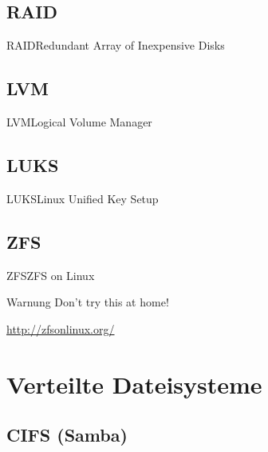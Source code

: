 \documentclass[pdflatex, ngerman]{beamer}
\begin{document}
\subsection{RAID}

\begin{frame}{RAID}{Redundant Array of Inexpensive Disks}

\end{frame}

\subsection{LVM}

\begin{frame}{LVM}{Logical Volume Manager}

\end{frame}

\subsection{LUKS}

\begin{frame}{LUKS}{Linux Unified Key Setup}

\end{frame}

\subsection{ZFS}

\begin{frame}{ZFS}{ZFS on Linux}


\begin{alertblock}{Warnung}
	Don't try this at home!
\end{alertblock}

\begin{block}{}
	\url{http://zfsonlinux.org/}
\end{block}

\end{frame}

\section{Verteilte Dateisysteme}

\subsection{CIFS (Samba)}
\end{document}
